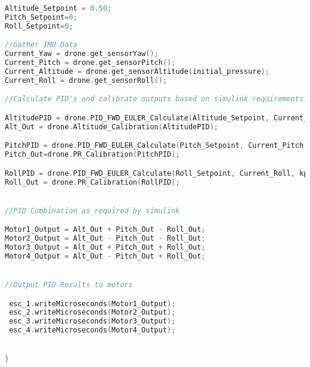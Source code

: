 \begin{lstlisting}[language=C,caption={Main.ino Drone Flight Program},label={lst:main.ino}]
Altitude_Setpoint = 0.50;
Pitch_Setpoint=0;
Roll_Setpoint=0;

//Gather IMU Data
Current_Yaw = drone.get_sensorYaw();
Current_Pitch = drone.get_sensorPitch();
Current_Altitude = drone.get_sensorAltitude(initial_pressure);
Current_Roll = drone.get_sensorRoll();

//Calculate PID's and calibrate outputs based on simulink requirements.

AltitudePID = drone.PID_FWD_EULER_Calculate(Altitude_Setpoint, Current_Altitude, kp_alt, kd_alt, ki_alt, Ts, N_alt);
Alt_Out = drone.Altitude_Calibration(AltitudePID);

PitchPID = drone.PID_FWD_EULER_Calculate(Pitch_Setpoint, Current_Pitch, kp_PR, kd_PR, ki_PR, Ts, N_PR);
Pitch_Out=drone.PR_Calibration(PitchPID);

RollPID = drone.PID_FWD_EULER_Calculate(Roll_Setpoint, Current_Roll, kp_PR, kd_PR, ki_PR, Ts, N_PR);
Roll_Out = drone.PR_Calibration(RollPID);


//PID Combination as required by simulink

Motor1_Output = Alt_Out + Pitch_Out - Roll_Out;
Motor2_Output = Alt_Out - Pitch_Out - Roll_Out;
Motor3_Output = Alt_Out + Pitch_Out + Roll_Out;
Motor4_Output = Alt_Out - Pitch_Out + Roll_Out;


//Output PID Results to motors

 esc_1.writeMicroseconds(Motor1_Output);
 esc_2.writeMicroseconds(Motor2_Output);
 esc_3.writeMicroseconds(Motor3_Output);
 esc_4.writeMicroseconds(Motor4_Output);


}

\end{lstlisting}

\newpage

